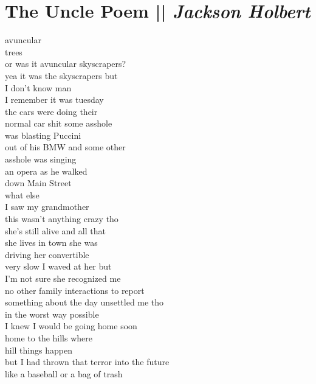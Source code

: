 \section[The Uncle Poem]{The Uncle Poem || \emph{Jackson Holbert} \hspace*{\fill}  \thepage}
\label{sec:The_Uncle_Poem}
\hspace{0pt}
\vfill
\begin{flushleft}
\begin{paracol}{3} %
avuncular\\
trees\\
or was it avuncular skyscrapers?\\
yea it was the skyscrapers but\\
I don’t know man\\
I remember it was tuesday\\
the cars were doing their\\
normal car shit some asshole\\
was blasting Puccini\\
out of his BMW and some other\\
asshole was singing\\
an opera as he walked\\
down Main Street\\
what else\\
I saw my grandmother\\
this wasn’t anything crazy tho\\
she’s still alive and all that\\
she lives in town she was\\
driving her convertible\\
very slow I waved at her but\\
I’m not sure she recognized me\\
no other family interactions to report\\
\switchcolumn[1]
something about the day unsettled me tho\\
in the worst way possible\\
I knew I would be going home soon \\ %
home to the hills where\\
hill things happen\\
but I had thrown that terror into the future\\
like a baseball or a bag of trash\\

\end{paracol}
\end{flushleft}

